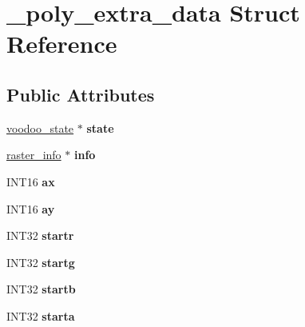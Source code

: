 \hypertarget{struct__poly__extra__data}{\section{\-\_\-poly\-\_\-extra\-\_\-data Struct Reference}
\label{struct__poly__extra__data}
}
\subsection*{Public Attributes}
\begin{DoxyCompactItemize}
\item 
\hypertarget{struct__poly__extra__data_a264ded6e87ed6b3531bd56dadf809af1}{\hyperlink{struct__voodoo__state}{voodoo\-\_\-state} $\ast$ {\bfseries state}}\label{struct__poly__extra__data_a264ded6e87ed6b3531bd56dadf809af1}

\item 
\hypertarget{struct__poly__extra__data_a699a0eb70973f604118f1e252b2efead}{\hyperlink{struct__raster__info}{raster\-\_\-info} $\ast$ {\bfseries info}}\label{struct__poly__extra__data_a699a0eb70973f604118f1e252b2efead}

\item 
\hypertarget{struct__poly__extra__data_a5c4b20c95068eaaa4d9a76c49b0da5f2}{I\-N\-T16 {\bfseries ax}}\label{struct__poly__extra__data_a5c4b20c95068eaaa4d9a76c49b0da5f2}

\item 
\hypertarget{struct__poly__extra__data_adb58950449a55a23992d2832af64cc53}{I\-N\-T16 {\bfseries ay}}\label{struct__poly__extra__data_adb58950449a55a23992d2832af64cc53}

\item 
\hypertarget{struct__poly__extra__data_a1eee6382b487d9d7f504d404a617b331}{I\-N\-T32 {\bfseries startr}}\label{struct__poly__extra__data_a1eee6382b487d9d7f504d404a617b331}

\item 
\hypertarget{struct__poly__extra__data_acd176799f876571009d76891469647f9}{I\-N\-T32 {\bfseries startg}}\label{struct__poly__extra__data_acd176799f876571009d76891469647f9}

\item 
\hypertarget{struct__poly__extra__data_ae4f234a141158626a3845767265f35c2}{I\-N\-T32 {\bfseries startb}}\label{struct__poly__extra__data_ae4f234a141158626a3845767265f35c2}

\item 
\hypertarget{struct__poly__extra__data_a2a40f6a5ea33c511ca17d2800126d093}{I\-N\-T32 {\bfseries starta}}\label{struct__poly__extra__data_a2a40f6a5ea33c511ca17d2800126d093}


\end{DoxyCompactItemize}
